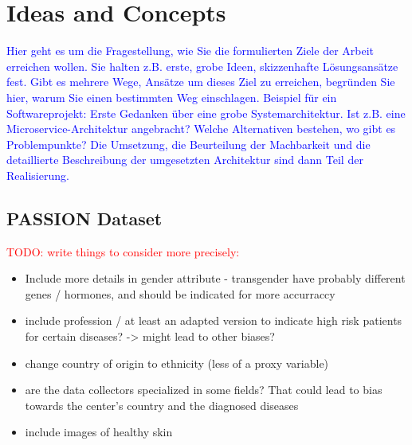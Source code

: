 \documentclass[12pt, a4paper, oneside]{book}   	%
\renewcommand{\todo}[1]{\textcolor{red}{TODO: #1}}
\newcommand{\baaCriteria}[1]{\textcolor{blue}{#1}}
\begin{document}
	\chapter{Ideas and Concepts}
		\baaCriteria{Hier geht es um die Fragestellung, wie Sie die formulierten Ziele der Arbeit erreichen wollen. Sie halten z.B. erste, grobe Ideen, skizzenhafte Lösungsansätze fest. Gibt es mehrere Wege, Ansätze um dieses Ziel zu erreichen, begründen Sie hier, warum Sie einen bestimmten Weg einschlagen. Beispiel für ein Softwareprojekt: Erste Gedanken über eine grobe Systemarchitektur. Ist z.B. eine Microservice-Architektur angebracht? Welche Alternativen bestehen, wo gibt es Problempunkte? Die Umsetzung, die Beurteilung der Machbarkeit und die detaillierte Beschreibung der umgesetzten Architektur sind dann Teil der Realisierung.}
		
		\section{PASSION Dataset}
			\todo{write things to consider more precisely:}
			\begin{itemize}
				\item Include more details in gender attribute - transgender have probably different genes / hormones, and should be indicated for more accurraccy
				\item include profession / at least an adapted version to indicate high risk patients for certain diseases? -> might lead to other biases?
				\item change country of origin to ethnicity (less of a proxy variable)
				\item are the data collectors specialized in some fields? That could lead to bias towards the center's country and the diagnosed diseases
				\item include images of healthy skin
			\end{itemize}
			
\end{document}
